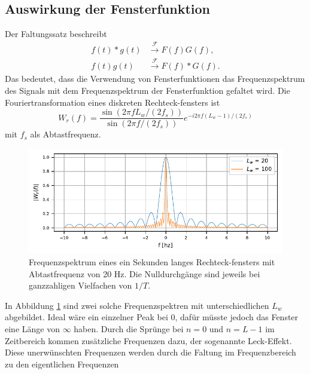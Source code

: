 \subsection{Auswirkung der Fensterfunktion}
Der Faltungssatz beschreibt 
\begin{align}
    f(t) * g(t)& \xrightarrow{\mathscr{F}} F(f)G(f),\\
    f(t) g(t)&\xrightarrow{\mathscr{F}}F(f) * G(f).
\end{align}
Das bedeutet, dass die Verwendung von Fensterfunktionen das Frequenzspektrum
des Signals mit dem Frequenzspektrum der Fensterfunktion gefaltet wird.
Die Fouriertransformation eines diskreten Rechteck-fensters ist 
\begin{equation}
    W_r(f) = \frac{\sin(2 \pi f  L_w / (2 f_s))}{\sin(2 \pi f / (2 f_s))} e^{-i 2 \pi f (L_w-1)/(2f_s)}
\end{equation}
mit $f_s$ als Abtastfrequenz.
\begin{figure}
    \centering
    \includegraphics{papers/sonogramm/images/rect_freq.pdf}
    \caption{Frequenzspektrum eines ein Sekunden langes Rechteck-fensters mit Abtastfrequenz von 20 Hz. Die Nulldurchgänge sind jeweils bei ganzzahligen Vielfachen
    von $1/T$.
    \label{sonogramm:rectfreq}
    }
\end{figure}
In Abbildung \ref{sonogramm:rectfreq} sind zwei solche Frequenzspektren mit unterschiedlichen $L_w$ abgebildet.
Ideal wäre ein einzelner Peak bei 0, dafür müsste jedoch das Fenster eine Länge von $\infty$ haben.
Durch die Sprünge bei $n = 0$ und $n = L-1$ im Zeitbereich kommen zusätzliche Frequenzen dazu, der sogenannte
Leck-Effekt.
Diese unerwünschten Frequenzen werden durch die Faltung im Frequenzbereich zu den eigentlichen Frequenzen 
